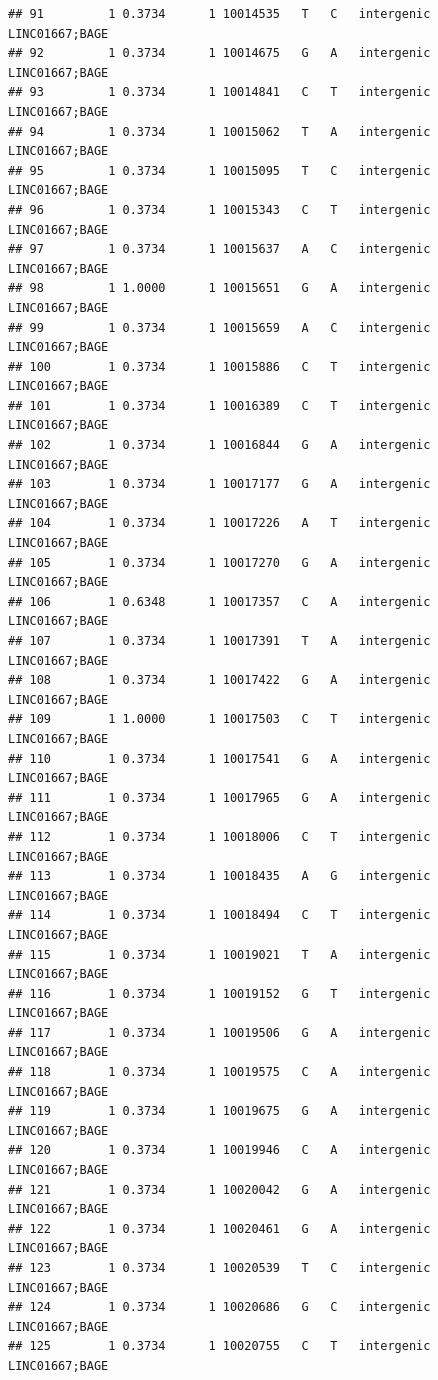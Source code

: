 \documentclass[
]{article}
\begin{document}
\begin{verbatim}
## 91         1 0.3734      1 10014535   T   C   intergenic LINC01667;BAGE
## 92         1 0.3734      1 10014675   G   A   intergenic LINC01667;BAGE
## 93         1 0.3734      1 10014841   C   T   intergenic LINC01667;BAGE
## 94         1 0.3734      1 10015062   T   A   intergenic LINC01667;BAGE
## 95         1 0.3734      1 10015095   T   C   intergenic LINC01667;BAGE
## 96         1 0.3734      1 10015343   C   T   intergenic LINC01667;BAGE
## 97         1 0.3734      1 10015637   A   C   intergenic LINC01667;BAGE
## 98         1 1.0000      1 10015651   G   A   intergenic LINC01667;BAGE
## 99         1 0.3734      1 10015659   A   C   intergenic LINC01667;BAGE
## 100        1 0.3734      1 10015886   C   T   intergenic LINC01667;BAGE
## 101        1 0.3734      1 10016389   C   T   intergenic LINC01667;BAGE
## 102        1 0.3734      1 10016844   G   A   intergenic LINC01667;BAGE
## 103        1 0.3734      1 10017177   G   A   intergenic LINC01667;BAGE
## 104        1 0.3734      1 10017226   A   T   intergenic LINC01667;BAGE
## 105        1 0.3734      1 10017270   G   A   intergenic LINC01667;BAGE
## 106        1 0.6348      1 10017357   C   A   intergenic LINC01667;BAGE
## 107        1 0.3734      1 10017391   T   A   intergenic LINC01667;BAGE
## 108        1 0.3734      1 10017422   G   A   intergenic LINC01667;BAGE
## 109        1 1.0000      1 10017503   C   T   intergenic LINC01667;BAGE
## 110        1 0.3734      1 10017541   G   A   intergenic LINC01667;BAGE
## 111        1 0.3734      1 10017965   G   A   intergenic LINC01667;BAGE
## 112        1 0.3734      1 10018006   C   T   intergenic LINC01667;BAGE
## 113        1 0.3734      1 10018435   A   G   intergenic LINC01667;BAGE
## 114        1 0.3734      1 10018494   C   T   intergenic LINC01667;BAGE
## 115        1 0.3734      1 10019021   T   A   intergenic LINC01667;BAGE
## 116        1 0.3734      1 10019152   G   T   intergenic LINC01667;BAGE
## 117        1 0.3734      1 10019506   G   A   intergenic LINC01667;BAGE
## 118        1 0.3734      1 10019575   C   A   intergenic LINC01667;BAGE
## 119        1 0.3734      1 10019675   G   A   intergenic LINC01667;BAGE
## 120        1 0.3734      1 10019946   C   A   intergenic LINC01667;BAGE
## 121        1 0.3734      1 10020042   G   A   intergenic LINC01667;BAGE
## 122        1 0.3734      1 10020461   G   A   intergenic LINC01667;BAGE
## 123        1 0.3734      1 10020539   T   C   intergenic LINC01667;BAGE
## 124        1 0.3734      1 10020686   G   C   intergenic LINC01667;BAGE
## 125        1 0.3734      1 10020755   C   T   intergenic LINC01667;BAGE

\end{verbatim}
\end{document}
